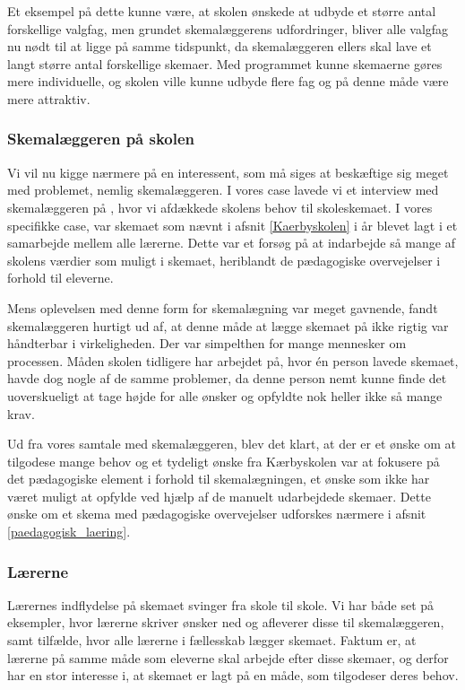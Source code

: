 Et eksempel på dette kunne være, at skolen ønskede at udbyde et større antal forskellige valgfag, men grundet skemalæggerens udfordringer, bliver alle valgfag nu nødt til at ligge på samme tidspunkt, da skemalæggeren ellers skal lave et langt større antal forskellige skemaer. Med programmet kunne skemaerne gøres mere individuelle, og skolen ville kunne udbyde flere fag og på denne måde være mere attraktiv.

\subsubsection{Skemalæggeren på skolen}
Vi vil nu kigge nærmere på en interessent, som må siges at beskæftige sig meget med problemet, nemlig skemalæggeren. I vores case lavede vi et interview med skemalæggeren på \school, hvor vi afdækkede skolens behov til skoleskemaet. I vores specifikke case, var skemaet som nævnt i afsnit \ref{Kaerbyskolen} i år blevet lagt i et samarbejde mellem alle lærerne. Dette var et forsøg på at indarbejde så mange af skolens værdier som muligt i skemaet, heriblandt de pædagogiske overvejelser i forhold til eleverne.

Mens oplevelsen med denne form for skemalægning var meget gavnende, fandt skemalæggeren hurtigt ud af, at denne måde at lægge skemaet på ikke rigtig var håndterbar i virkeligheden. Der var simpelthen for mange mennesker om processen. Måden skolen tidligere har arbejdet på, hvor \'en person lavede skemaet, havde dog nogle af de samme problemer, da denne person nemt kunne finde det uoverskueligt at tage højde for alle ønsker og opfyldte nok heller ikke så mange krav.

Ud fra vores samtale med skemalæggeren, blev det klart, at der er et ønske om at tilgodese mange behov og et tydeligt ønske fra Kærbyskolen var at fokusere på det pædagogiske element i forhold til skemalægningen, et ønske som ikke har været muligt at opfylde ved hjælp af de manuelt udarbejdede skemaer. Dette ønske om et skema med pædagogiske overvejelser udforskes nærmere i afsnit \ref{paedagogisk_laering}.

\subsubsection{Lærerne}
Lærernes indflydelse på skemaet svinger fra skole til skole. Vi har både set på eksempler, hvor lærerne skriver ønsker ned og afleverer disse til skemalæggeren\cite{interview_Tingstrup}, samt tilfælde, hvor alle lærerne i fællesskab lægger skemaet\cite{interview_Kaerby}. Faktum er, at lærerne på samme måde som eleverne skal arbejde efter disse skemaer, og derfor har en stor interesse i, at skemaet er lagt på en måde, som tilgodeser deres behov.

